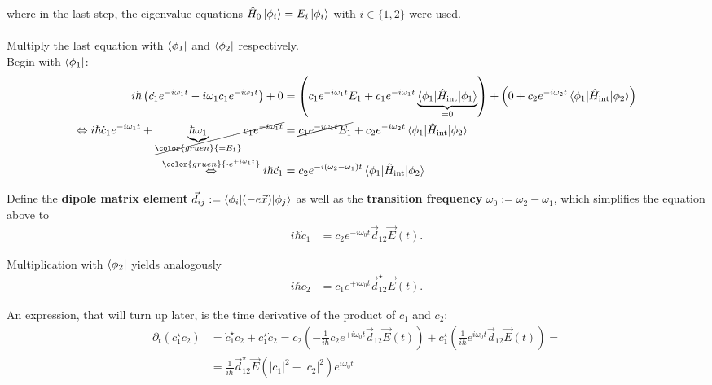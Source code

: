 \documentclass{article}
\newcommand{\lr}[1]{\left(#1\right)}
\newcommand{\comment}[1]{{\color{gruen} {#1}}}
\begin{document}
{	where in the last step, the eigenvalue equations $\hat{H}_0 \ket{\phi_i} = E_i \ket{\phi_i}$ with $i\in\{1,2\}$ were used.\\
	\\
	Multiply the last equation with $\bra{\phi_1}$ and $\bra{\phi_2}$ respectively.\\
	Begin with $\bra{\phi_1}$:
		\begin{align*}
			i\hbar \lr{ \dot{c_1} e^{-i\omega_1 t} - i\omega_1 c_1 e^{-i\omega_1 t} } + 0 &= \lr{ c_1 e^{-i\omega_1 t} E_1 + c_1 e^{-i\omega_1 t} \underbrace{ \braket{ \phi_1 | \hat{H}_\text{int} | \phi_1 }}_{=0} } + \lr{ 0 + c_2 e^{-i\omega_2 t} \braket{ \phi_1 | \hat{H}_\text{int} | \phi_2 } } \\
			\Leftrightarrow i\hbar \dot{c}_1 e^{-i\omega_1 t} + \cancel{ \underbrace{ \hbar\omega_1 }_{\comment{= E_1}} c_1 e^{-i\omega_1 t} } &= \cancel{ c_1 e^{-i\omega_1 t} E_1 } + c_2 e^{-i\omega_2 t} \braket{ \phi_1 | \hat{H}_\text{int} | \phi_2 } \\
			\stackrel{\comment{\cdot e^{+i\omega_1 t}}}{\Leftrightarrow} i\hbar \dot{c_1} &= c_2 e^{-i(\omega_2 - \omega_1) t} \braket{ \phi_1 | \hat{H}_\text{int} | \phi_2 }
		\end{align*}

	Define the \textbf{dipole matrix element} $\vec{d}_{ij} := \braket{ \phi_i | (-e\vec{x}) | \phi_j }$ as well as the \textbf{transition frequency} $\omega_0 := \omega_2 - \omega_1$, which simplifies the equation above to
		\begin{align*}
			i\hbar \dot{c}_1 &= c_2 e^{-i\omega_0 t} \vec{d}_{12}\vec{E}(t).
		\end{align*}
	
	Multiplication with $\bra{\phi_2}$ yields analogously
		\begin{align*}
			i\hbar\dot{c}_2 &= c_1 e^{+i\omega_0 t} \vec{d}_{12}^\star \vec{E}(t).
		\end{align*}


	An expression, that will turn up later, is the time derivative of the product of $c_1$ and $c_2$:
		\begin{align*}
			\partial_t (c_1^\star c_2) &= \dot{c}_1^\star c_2 + c_1^\star \dot{c}_2 = c_2 \lr{ -\frac{1}{i\hbar} c_2 e^{+i\omega_0 t} \vec{d}_{12} \vec{E}(t) } + c_1^\star \lr{ \frac{1}{i\hbar} e^{i\omega_0 t} \vec{d}_{12} \vec{E}(t) } = \\
			&= \frac{1}{i\hbar} \vec{d}_{12}^\star \vec{E} \lr{ |c_1|^2 - |c_2|^2 } e^{i\omega_0 t}
		\end{align*}
	
}
\end{document}
